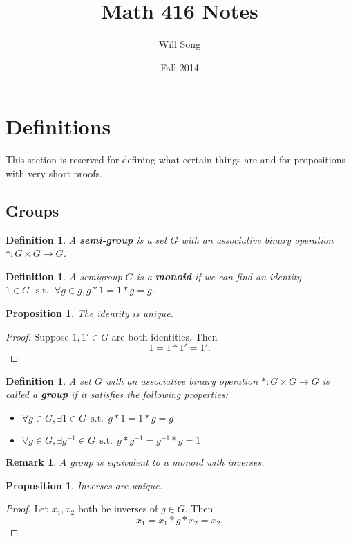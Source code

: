 \documentclass{article}
\title{Math 416 Notes}
\author{Will Song}
\date{Fall 2014}
\theoremstyle{norm}
\newtheorem{df}[thm]{Definition}
\newtheorem{rem}[thm]{Remark}
\newtheorem{prop}[thm]{Proposition}
\renewcommand{\st}{\,\operatorname{s.t.}\,}
\begin{document}
\maketitle
\newpage

\tableofcontents
\newpage

\section{Definitions}
This section is reserved for defining what certain things are and for
propositions with very short proofs.

\subsection{Groups}
\begin{df}
A \textbf{semi-group} is a set $G$ with an associative binary operation $* : G
\times G \rightarrow G$.
\end{df}

\begin{df}
A semigroup $G$ is a \textbf{monoid} if we can find an identity $1 \in G \, \st
\, \forall g \in g, g * 1 = 1 * g = g$.
\end{df}

\begin{prop}
The identity is unique.
\end{prop}
\begin{proof}
Suppose $1, 1' \in G$ are both identities. Then
\[ 1 = 1 * 1' = 1'. \]
\end{proof}

\begin{df}
A set $G$ with an associative binary operation $* : G \times G
\rightarrow G$ is called a \textbf{group} if it satisfies the following
properties:
\begin{itemize}
\item $\forall g \in G, \exists 1 \in G \st g * 1 = 1 * g = g$
\item $\forall g \in G, \exists g^{-1} \in G \st g * g^{-1} = g^{-1} * g
= 1$
\end{itemize}
\end{df}
\begin{rem}
A group is equivalent to a monoid with inverses.
\end{rem}
\begin{prop}
Inverses are unique.
\end{prop}
\begin{proof}
Let $x_1, x_2$ both be inverses of $g \in G$. Then
\[ x_1 = x_1 * g * x_2 = x_2. \]
\end{proof}
\end{document}
